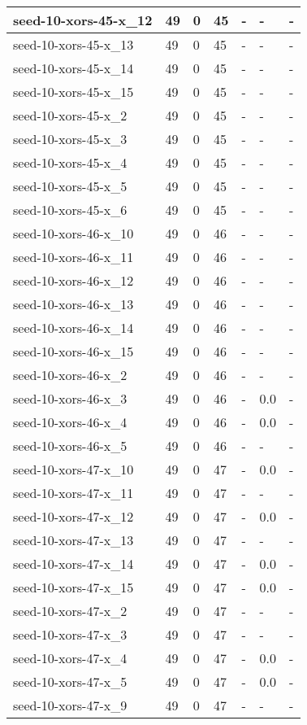 \begin{scriptsize}
\begin{longtable}{|p{5cm}|l|l|l|l|l|l|}
seed-10-xors-45-x\_12&49&0&45&-&-&- \\ \hline 
seed-10-xors-45-x\_13&49&0&45&-&-&- \\ \hline 
seed-10-xors-45-x\_14&49&0&45&-&-&- \\ \hline 
seed-10-xors-45-x\_15&49&0&45&-&-&- \\ \hline 
seed-10-xors-45-x\_2&49&0&45&-&-&- \\ \hline 
seed-10-xors-45-x\_3&49&0&45&-&-&- \\ \hline 
seed-10-xors-45-x\_4&49&0&45&-&-&- \\ \hline 
seed-10-xors-45-x\_5&49&0&45&-&-&- \\ \hline 
seed-10-xors-45-x\_6&49&0&45&-&-&- \\ \hline 
seed-10-xors-46-x\_10&49&0&46&-&-&- \\ \hline 
seed-10-xors-46-x\_11&49&0&46&-&-&- \\ \hline 
seed-10-xors-46-x\_12&49&0&46&-&-&- \\ \hline 
seed-10-xors-46-x\_13&49&0&46&-&-&- \\ \hline 
seed-10-xors-46-x\_14&49&0&46&-&-&- \\ \hline 
seed-10-xors-46-x\_15&49&0&46&-&-&- \\ \hline 
seed-10-xors-46-x\_2&49&0&46&-&-&- \\ \hline 
seed-10-xors-46-x\_3&49&0&46&-&0.0&- \\ \hline 
seed-10-xors-46-x\_4&49&0&46&-&0.0&- \\ \hline 
seed-10-xors-46-x\_5&49&0&46&-&-&- \\ \hline 
seed-10-xors-47-x\_10&49&0&47&-&0.0&- \\ \hline 
seed-10-xors-47-x\_11&49&0&47&-&-&- \\ \hline 
seed-10-xors-47-x\_12&49&0&47&-&0.0&- \\ \hline 
seed-10-xors-47-x\_13&49&0&47&-&-&- \\ \hline 
seed-10-xors-47-x\_14&49&0&47&-&0.0&- \\ \hline 
seed-10-xors-47-x\_15&49&0&47&-&0.0&- \\ \hline 
seed-10-xors-47-x\_2&49&0&47&-&-&- \\ \hline 
seed-10-xors-47-x\_3&49&0&47&-&-&- \\ \hline 
seed-10-xors-47-x\_4&49&0&47&-&0.0&- \\ \hline 
seed-10-xors-47-x\_5&49&0&47&-&0.0&- \\ \hline 
seed-10-xors-47-x\_9&49&0&47&-&-&- \\ \hline 

\end{longtable}
\end{scriptsize}
